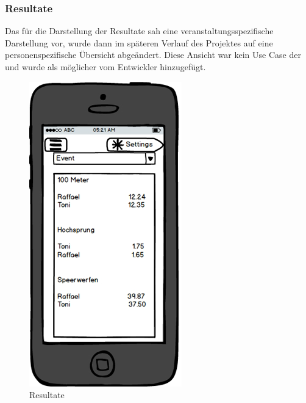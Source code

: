 \FloatBarrier
\subsubsection{Resultate}\label{mockup_results}
Das  für die Darstellung der Resultate sah eine veranstaltungsspezifische Darstellung vor, wurde dann im späteren Verlauf des Projektes auf eine personenspezifische Übersicht abgeändert. Diese Ansicht war kein Use Case der  und wurde als möglicher  vom Entwickler hinzugefügt.
\begin{figure}[h]
\centering
\includegraphics[scale=0.5]{images/mockups/results.png}
\caption{Resultate}
\label{fig:mockup_results}
\end{figure}

\newpage
\FloatBarrier
